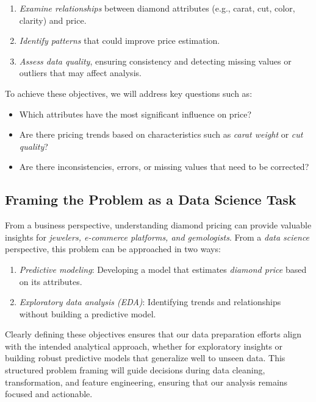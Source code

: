 \documentclass[
  11pt,
]{book}
\providecommand{\tightlist}{%
  \setlength{\itemsep}{0pt}\setlength{\parskip}{0pt}}
\theoremstyle{definition}
\theoremstyle{definition}
\theoremstyle{definition}
\theoremstyle{definition}
\theoremstyle{remark}
\begin{document}
\begin{enumerate}
\def\labelenumi{\arabic{enumi}.}
\tightlist
\item
  \emph{Examine relationships} between diamond attributes (e.g., carat, cut, color, clarity) and price.\\
\item
  \emph{Identify patterns} that could improve price estimation.\\
\item
  \emph{Assess data quality}, ensuring consistency and detecting missing values or outliers that may affect analysis.
\end{enumerate}

To achieve these objectives, we will address key questions such as:

\begin{itemize}
\tightlist
\item
  Which attributes have the most significant influence on price?\\
\item
  Are there pricing trends based on characteristics such as \emph{carat weight} or \emph{cut quality}?\\
\item
  Are there inconsistencies, errors, or missing values that need to be corrected?
\end{itemize}

\subsection*{Framing the Problem as a Data Science Task}\label{framing-the-problem-as-a-data-science-task}


From a business perspective, understanding diamond pricing can provide valuable insights for \emph{jewelers, e-commerce platforms, and gemologists}. From a \emph{data science} perspective, this problem can be approached in two ways:

\begin{enumerate}
\def\labelenumi{\arabic{enumi}.}
\tightlist
\item
  \emph{Predictive modeling}: Developing a model that estimates \emph{diamond price} based on its attributes.\\
\item
  \emph{Exploratory data analysis (EDA)}: Identifying trends and relationships without building a predictive model.
\end{enumerate}

Clearly defining these objectives ensures that our data preparation efforts align with the intended analytical approach, whether for exploratory insights or building robust predictive models that generalize well to unseen data. This structured problem framing will guide decisions during data cleaning, transformation, and feature engineering, ensuring that our analysis remains focused and actionable.
\end{document}
